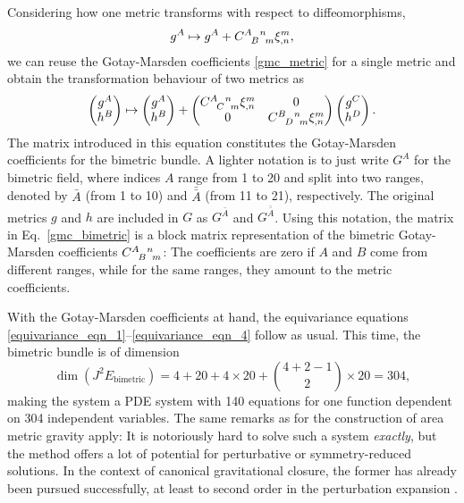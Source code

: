 Considering how one metric transforms with respect to diffeomorphisms,
\begin{equation}
  g^A \mapsto g^A + \gmc{A}{B}{n}{m}\xi^m_{,n},
\end{equation}
we can reuse the Gotay-Marsden coefficients \eqref{gmc_metric} for a single metric and obtain the transformation behaviour of two metrics as
\begin{equation}\label{gmc_bimetric}
  \begin{pmatrix}g^A \\ h^B\end{pmatrix} \mapsto \begin{pmatrix}g^A \\ h^B\end{pmatrix} + \begin{pmatrix}\gmc{A}{C}{n}{m}\xi^m_{,n} & 0 \\ 0 & \gmc{B}{D}{n}{m}\xi^m_{,n}\end{pmatrix} \begin{pmatrix}g^C \\ h^D\end{pmatrix}.
\end{equation}
The matrix introduced in this equation constitutes the Gotay-Marsden coefficients for the bimetric bundle. A lighter notation is to just write $G^A$ for the bimetric field, where indices $A$ range from 1 to 20 and split into two ranges, denoted by $\bar A$ (from 1 to 10) and $\bar{\bar A}$ (from 11 to 21), respectively. The original metrics $g$ and $h$ are included in $G$ as $G^{\bar A}$ and $G^{\bar{\bar A}}$. Using this notation, the matrix in Eq.\ \ref{gmc_bimetric} is a block matrix representation of the bimetric Gotay-Marsden coefficients $\gmc{A}{B}{n}{m}$: The coefficients are zero if $A$ and $B$ come from different ranges, while for the same ranges, they amount to the metric coefficients.

With the Gotay-Marsden coefficients at hand, the equivariance equations \eqref{equivariance_eqn_1}--\eqref{equivariance_eqn_4} follow as usual. This time, the bimetric bundle is of dimension
\begin{equation}
  \operatorname{dim}(J^2E_\text{bimetric}) = 4 + 20 + 4\times 20 + \binom{4 + 2 - 1}{2}\times 20 = 304,
\end{equation}
making the system a PDE system with 140 equations for one function dependent on 304 independent variables. The same remarks as for the construction of area metric gravity apply: It is notoriously hard to solve such a system \emph{exactly}, but the method offers a lot of potential for perturbative or symmetry-reduced solutions. In the context of canonical gravitational closure, the former has already been pursued successfully, at least to second order in the perturbation expansion \cite{Wierzba_2018,Beier_2018}.

